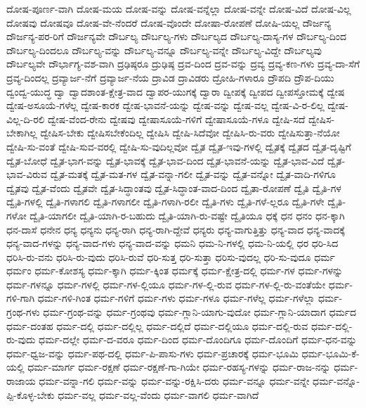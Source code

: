 {ದೋಷ-ಪೂರ್ಣ-ವಾಗಿ
ದೋಷ-ಮಯ
ದೋಷ-ವನ್ನು
ದೋಷ-ವನ್ನೆಲ್ಲಾ
ದೋಷ-ವನ್ನೇ
ದೋಷ-ವಿದೆ
ದೋಷ-ವಿಲ್ಲ
ದೋಷವು
ದೋಷವೂ
ದೋಷ-ವೇ-ನೆಂದರೆ
ದೋಷ-ವೊಂದೇ
ದೋಷಾ-ರೋಪಣೆ
ದೋಷಿ-ಯಲ್ಲ
ದೌರ್ಜನ್ಯ
ದೌರ್ಜನ್ಯ-ಪರ-ರಿಗೆ
ದೌರ್ಜನ್ಯವೇ
ದೌರ್ಬಲ್ಯ
ದೌರ್ಬಲ್ಯ-ಗಳು
ದೌರ್ಬಲ್ಯದ
ದೌರ್ಬಲ್ಯ-ದಾಸ್ಯ-ಗಳ
ದೌರ್ಬಲ್ಯ-ದಿಂದ
ದೌರ್ಬಲ್ಯ-ದಿಂದಲೂ
ದೌರ್ಬಲ್ಯ-ವನ್ನು
ದೌರ್ಬಲ್ಯ-ವನ್ನೂ
ದೌರ್ಬಲ್ಯ-ವನ್ನೇ
ದೌರ್ಬಲ್ಯ-ವಿದ್ದೇ
ದೌರ್ಬಲ್ಯವು
ದೌರ್ಬಲ್ಯವೇ
ದೌರ್ಭಾಗ್ಯ-ವಶ-ವಾಗಿ
ದ್ರಢಿಷ್ಠರೂ
ದ್ರುಢಿಷ್ಠ
ದ್ರವ-ದಿಂದ
ದ್ರವ-ವನ್ನು
ದ್ರವ್ಯ
ದ್ರವ್ಯ-ಕಣ-ಗಳು
ದ್ರವ್ಯ-ದಾ-ಸೆಗೆ
ದ್ರವ್ಯ-ದಿಂದಲ್ಲ
ದ್ರವ್ಯಾರ್ಜ-ನೆಗೆ
ದ್ರವ್ಯಾರ್ಜ-ನೆಯ
ದ್ರಾವಿಡ
ದ್ರಾವಿಡರು
ದ್ರೋಹಿ-ಗಳಾರೂ
ದ್ರೌಪದಿ
ದ್ರೌಪ-ದಿಯು
ದ್ವಂದ್ವ-ಯುದ್ಧ
ದ್ವಾ
ದ್ವಾದಶಾಂತ-ಕ್ಷೇತ್ರ-ವಾದ
ದ್ವಾಪರ-ಯುಗಕ್ಕೆ
ದ್ವಾರಾ
ದ್ವೀಪಕ್ಕೆ
ದ್ವೀಪದ
ದ್ವೀಪಸ್ತೋಮಕ್ಕೆ
ದ್ವೇಷ
ದ್ವೇಷ-ಅಸೂಯೆ-ಗಳೆಲ್ಲ
ದ್ವೇಷ-ಕಾರಕ
ದ್ವೇಷ-ಭಾವನೆ-ಯನ್ನು
ದ್ವೇಷ-ವನ್ನು
ದ್ವೇಷ-ವಲ್ಲ
ದ್ವೇಷ-ವಿ-ರ-ಲಿಲ್ಲ
ದ್ವೇಷ-ವಿಲ್ಲ-ದಿ-ರಲಿ
ದ್ವೇಷ-ವೆಂದ-ರೇನು
ದ್ವೇಷವು
ದ್ವೇಷಾಸೂಯೆ-ಗಳಿಗೆ
ದ್ವೇಷಾಸೂಯೆ-ಗಳೂ
ದ್ವೇಷಿ-ಸದೆ
ದ್ವೇಷಿಸ-ಬೇಕಾಗಿಲ್ಲ
ದ್ವೇಷಿಸ-ಬೇಕು
ದ್ವೇಷಿಸಬೇಕೆಂದಿಲ್ಲ
ದ್ವೇಷಿಸಿ
ದ್ವೇಷಿ-ಸಿದೆವೋ
ದ್ವೇಷಿಸಿ-ರು-ವರು
ದ್ವೇಷಿಸುತ್ತಾ-ನೆಯೋ
ದ್ವೇಷಿ-ಸು-ವಂತೆ
ದ್ವೇಷಿ-ಸುವ-ವರಲ್ಲಿ
ದ್ವೇಷಿ-ಸು-ವುದಿಲ್ಲವೋ
ದ್ವೈತ
ದ್ವೈತ-ಇವು-ಗಳಲ್ಲಿ
ದ್ವೈತಕ್ಕೆ
ದ್ವೈತದ
ದ್ವೈತ-ದೃಷ್ಟಿಗೆ
ದ್ವೈತ-ಬೋಧೆ
ದ್ವೈತ-ಭಾಗ-ವನ್ನು
ದ್ವೈತ-ಭಾವಕ್ಕೆ
ದ್ವೈತ-ಭಾವ-ದಿಂದ
ದ್ವೈತ-ಭಾವನೆ-ಯನ್ನು
ದ್ವೈತ-ಭಾವ-ವಿದೆ
ದ್ವೈತ-ಭಾವ-ವಿರುವ
ದ್ವೈತ-ಮತಕ್ಕೆ
ದ್ವೈತ-ಮತ-ಗಳ
ದ್ವೈತ-ವನ್ನಾ-ಗಲೀ
ದ್ವೈತ-ವನ್ನು
ದ್ವೈತ-ವನ್ನೋ
ದ್ವೈತ-ವಾದಿ-ಗಳಿಗೂ
ದ್ವೈತವು
ದ್ವೈತ-ವೆಂದು
ದ್ವೈತವೇ
ದ್ವೈತ-ಸಿದ್ಧಾಂತವು
ದ್ವೈತ-ಸಿದ್ಧಾಂತ-ವಾದ-ದಿಂದ
ದ್ವೈತಾ-ರೋಪಣೆ
ದ್ವೈತಿ
ದ್ವೈತಿ-ಗಳ
ದ್ವೈತಿ-ಗಳಲ್ಲಿ
ದ್ವೈತಿ-ಗಳಾಗಲಿ
ದ್ವೈತಿ-ಗಳಾಗಲೀ
ದ್ವೈತಿ-ಗಳಾಗಿ-ರಲೀ
ದ್ವೈತಿ-ಗಳು
ದ್ವೈತಿ-ಗಳೆ-ಲ್ಲರೂ
ದ್ವೈತಿ-ಗಳೇ
ದ್ವೈತಿ-ಗಳೋ
ದ್ವೈತಿ-ಯಾಗಲೀ
ದ್ವೈತಿ-ಯಾಗಿ-ರ-ಬಹುದು
ದ್ವೈತಿ-ಯಾಗಿ-ರು-ವಷ್ಟೇ
ದ್ವೈತಿಯೂ
ಧಕ್ಕೆ
ಧನ
ಧನಂ
ಧನ-ಕ್ಕಾಗಿ
ಧನ-ದಾಸೆ
ಧನೇನ
ಧನ್ಯ
ಧನ್ಯನು
ಧನ್ಯ-ರಾಗಿ
ಧನ್ಯ-ರಾಗಿ-ದ್ದೇವೆ
ಧನ್ಯರು
ಧನ್ಯ-ವಾಗುತ್ತಿತ್ತು
ಧನ್ಯ-ವಾದ
ಧನ್ಯ-ವಾದಕ್ಕೆ
ಧನ್ಯ-ವಾದ-ಗಳನ್ನು
ಧನ್ಯ-ವಾದ-ಗಳು
ಧನ್ಯ-ವಾದ-ವನ್ನು
ಧಮನಿ
ಧಮ-ನಿ-ಗಳಲ್ಲಿ
ಧಮ-ನಿ-ಯಲ್ಲಿ
ಧರ
ಧರಿ-ಸಿದ
ಧರಿಸಿ-ರು-ವನು
ಧರಿಸಿ-ರು-ವುದು
ಧರಿಸಿ-ರುವೆ
ಧರಿ-ಸುತ್ತ
ಧರಿ-ಸುತ್ತಾ
ಧರಿಸು-ವುದಲ್ಲ
ಧರಿ-ಸು-ವುದೂ
ಧರ್ಮ
ಧರ್ಮಂ
ಧರ್ಮ-ಕೋಶಸ್ಯ
ಧರ್ಮ-ಕ್ಕಾಗಿ
ಧರ್ಮ-ಕ್ಕಿಂತ
ಧರ್ಮಕ್ಕೆ
ಧರ್ಮ-ಕ್ಷೇತ್ರ-ದಲ್ಲಿ
ಧರ್ಮ-ಗಳ
ಧರ್ಮ-ಗಳನ್ನು
ಧರ್ಮ-ಗಳನ್ನೂ
ಧರ್ಮ-ಗಳಲ್ಲಿ
ಧರ್ಮ-ಗಳ-ಲ್ಲಿಯೂ
ಧರ್ಮ-ಗಳ-ಲ್ಲಿ-ರುವ
ಧರ್ಮ-ಗಳ-ಲ್ಲಿ-ರು-ವಂತೆಯೇ
ಧರ್ಮ-ಗಳಿ-ಗಾಗಿ
ಧರ್ಮ-ಗಳಿ-ಗಿಂತ
ಧರ್ಮ-ಗಳಿಗೆ
ಧರ್ಮ-ಗಳು
ಧರ್ಮ-ಗಳೂ
ಧರ್ಮ-ಗಳೆಲ್ಲ
ಧರ್ಮ-ಗಳೆಲ್ಲಾ
ಧರ್ಮ-ಗ್ರಂಥ-ಗಳು
ಧರ್ಮ-ಗ್ರಂಥ-ವನ್ನು
ಧರ್ಮ-ಗ್ರಂಥವು
ಧರ್ಮ-ಗ್ಲಾನಿ-ಯಾಗು-ವುದೋ
ಧರ್ಮ-ಗ್ಲಾನಿ-ಯಾದಾಗ
ಧರ್ಮದ
ಧರ್ಮ-ದಂತಹ
ಧರ್ಮ-ದಲ್ಲಿ
ಧರ್ಮ-ದಲ್ಲಿಲ್ಲ
ಧರ್ಮ-ದಲ್ಲಿದೆ
ಧರ್ಮ-ದಲ್ಲಿಯೂ
ಧರ್ಮ-ದಲ್ಲಿ-ರುವ
ಧರ್ಮ-ದಲ್ಲಿ-ರು-ವುದು
ಧರ್ಮ-ದಲ್ಲೇ
ಧರ್ಮ-ದ-ವರೂ
ಧರ್ಮ-ದಿಂದ
ಧರ್ಮ-ದೊಂದಿಗೂ
ಧರ್ಮ-ದೊಂದಿಗೆ
ಧರ್ಮ-ಧನ-ವನ್ನು
ಧರ್ಮ-ಧ್ವಜ-ವನ್ನು
ಧರ್ಮ-ಪಥ-ದಲ್ಲಿ
ಧರ್ಮ-ಪಿ-ಪಾಸು-ಗಳು
ಧರ್ಮ-ಪ್ರಚಾರಕ್ಕೆ
ಧರ್ಮ-ಭೂಮಿ
ಧರ್ಮ-ಭೂಮಿ-ಕೆ-ಯಲ್ಲಿ
ಧರ್ಮ-ಮಾರ್ಗ
ಧರ್ಮ-ರಕ್ಷಣೆ
ಧರ್ಮ-ರಕ್ಷಣೆ-ಗಾ-ಗಿಯೇ
ಧರ್ಮ-ರಹಸ್ಯ-ಗಳನ್ನು
ಧರ್ಮ-ರಾಜ-ನನ್ನು
ಧರ್ಮ-ರಾಜಾಯ
ಧರ್ಮ-ವನ್ನಾ-ಗಲಿ
ಧರ್ಮ-ವನ್ನು
ಧರ್ಮ-ವನ್ನು-ರಕ್ಷಿಸಿ-ದರು
ಧರ್ಮ-ವನ್ನೂ
ಧರ್ಮ-ವನ್ನೇ
ಧರ್ಮ-ವನ್ನೊ-ಪ್ಪಿ-ಕೊಳ್ಳ-ಬೇಕು
ಧರ್ಮ-ವಲ್ಲ
ಧರ್ಮ-ವಲ್ಲ-ವೆಂದು
ಧರ್ಮ-ವಾಗಲಿ
ಧರ್ಮ-ವಾಗಿದೆ
}

